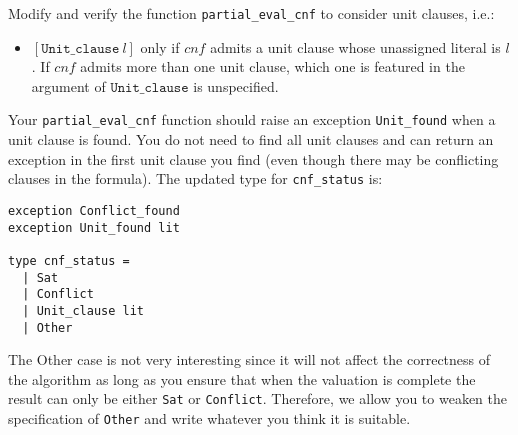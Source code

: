 \documentclass[11pt]{article}
\begin{document}
\begin{task}[5 pts]
Modify and verify the function \verb|partial_eval_cnf| to consider unit clauses, i.e.:
\begin{itemize}
\item $[\texttt{Unit\_clause}\ l]$ only if $cnf$ admits a unit clause whose unassigned literal is $l$. If $cnf$ admits more than one unit clause, which one is featured in the argument of $\texttt{Unit\_clause}$ is unspecified.
\end{itemize}

Your \texttt{partial\_eval\_cnf} function should raise an exception \texttt{Unit\_found} when a unit clause is found. You do not need to find all unit clauses and can return an exception in the first unit clause you find (even though there may be conflicting clauses in the formula).
%
The updated type for \verb|cnf_status| is:
\begin{lstlisting}
exception Conflict_found
exception Unit_found lit

type cnf_status =
  | Sat
  | Conflict
  | Unit_clause lit
  | Other
\end{lstlisting}

The Other case is not very interesting since it will not affect the correctness of the algorithm as long as you ensure that when the valuation is complete the result can only be either \texttt{Sat} or \texttt{Conflict}. Therefore, we allow you to weaken the specification of \texttt{Other} and write whatever you think it is suitable.
\end{task}
\end{document}
